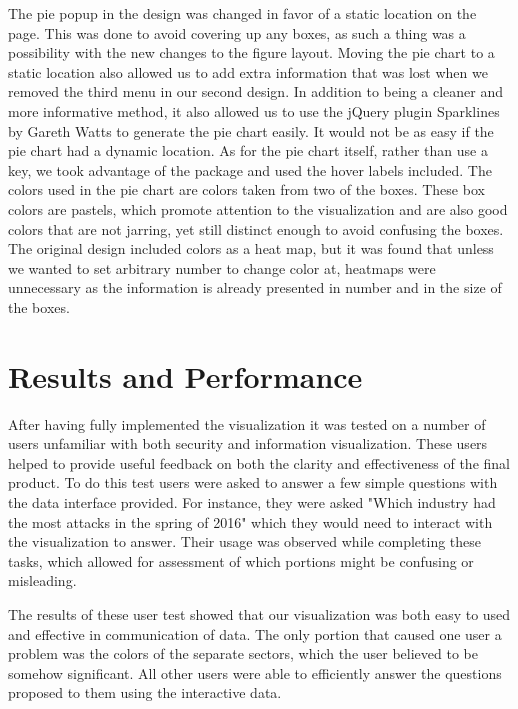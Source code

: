 \documentclass[journal]{vgtc}                %
\begin{document}
The pie popup in the design was changed in favor of a static location on the page. This was done to avoid covering up any 
boxes, as such a thing was a possibility with the new changes to the figure layout. Moving the pie chart to a static 
location also allowed us to add extra information that was lost when we removed the third menu in our second design. In 
addition to being a cleaner and more informative method, it also allowed us to use the jQuery plugin Sparklines by Gareth Watts to 
generate the pie chart easily. It would not be as easy if the pie chart had a dynamic location. As for the pie chart itself,
rather than use a key, we took advantage of the package and used the hover labels included. The colors used in the pie chart
are colors taken from two of the boxes. These box colors are pastels, which promote attention to the visualization and are 
also good colors that are not jarring, yet still distinct enough to avoid confusing the boxes. The original design included
colors as a heat map, but it was found that unless we wanted to set arbitrary number to change color at, heatmaps were 
unnecessary as the information is already presented in number and in the size of the boxes.

\section{Results and Performance}
After having fully implemented the visualization it was tested on a number of users unfamiliar with both security and information visualization. 
These users helped to provide useful feedback on both the clarity and effectiveness of the final product. 
To do this test users were asked to answer a few simple questions with the data interface provided.
For instance, they were asked "Which industry had the most attacks in the spring of 2016" which they would need to interact with the visualization to answer.
Their usage was observed while completing these tasks, which allowed for assessment of which portions might be confusing or misleading.

The results of these user test showed that our visualization was both easy to used and effective in communication of data.
The only portion that caused one user a problem was the colors of the separate sectors, which the user believed to be somehow significant.
All other users were able to efficiently answer the questions proposed to them using the interactive data.
\end{document}
